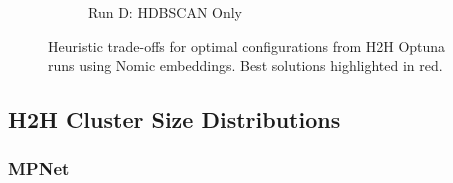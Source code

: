 \documentclass[10pt,oneside]{report}
\begin{document}
\begin{figure}[H]
\begin{subfigure}[b]{0.48\textwidth}
        \caption{Run D: HDBSCAN Only}
        \label{fig:nomic_hdbscan_only_h2h_config} 
    \end{subfigure}
    \caption{Heuristic trade-offs for optimal configurations from H2H Optuna runs using Nomic embeddings. Best solutions highlighted in red.}
    \label{fig:nomic_h2h_config_appendix} %
\end{figure}

\subsection{H2H Cluster Size Distributions}\label{sec:h2h_whisker_appendix}

\subsubsection{MPNet}
\end{document}
